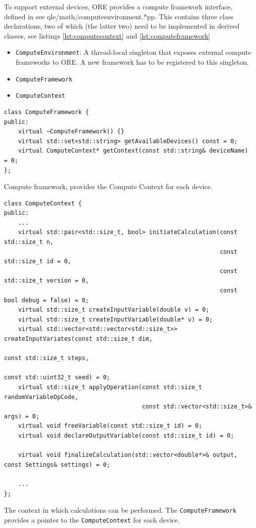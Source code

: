 \documentclass[12pt, a4paper]{report}
\begin{document}
To support external devices, ORE provides a compute framework interface, defined in
see qle/math/computeenvironment.*pp. This contains three class declarations, two of which (the latter two)
need to be implemented in derived classes, see listings \ref{lst:computecontext} and
\ref{lst:computeframework}
\begin{itemize}
\item {\tt ComputeEnvironment}: A thread-local singleton that exposes external compute frameworks to ORE. A new framework has to be registered to this singleton.
\item {\tt ComputeFramework}
\item {\tt ComputeContext} 
\end{itemize}

\begin{listing}[hbt]
\begin{verbatim}
class ComputeFramework {
public:
    virtual ~ComputeFramework() {}
    virtual std::set<std::string> getAvailableDevices() const = 0;
    virtual ComputeContext* getContext(const std::string& deviceName) = 0;
};
\end{verbatim}
\caption{Compute framework, provides the Compute Context for each device.}
\label{lst:computeframework}
\end{listing}

\begin{listing}[hbt]
\begin{verbatim}
class ComputeContext {
public:
    ...
    virtual std::pair<std::size_t, bool> initiateCalculation(const std::size_t n,
                                                             const std::size_t id = 0,
                                                             const std::size_t version = 0,
                                                             const bool debug = false) = 0;
    virtual std::size_t createInputVariable(double v) = 0;
    virtual std::size_t createInputVariable(double* v) = 0;
    virtual std::vector<std::vector<std::size_t>> createInputVariates(const std::size_t dim,
                                                                      const std::size_t steps,
                                                                      const std::uint32_t seed) = 0;
    virtual std::size_t applyOperation(const std::size_t randomVariableOpCode,
                                       const std::vector<std::size_t>& args) = 0;
    virtual void freeVariable(const std::size_t id) = 0;
    virtual void declareOutputVariable(const std::size_t id) = 0;

    virtual void finalizeCalculation(std::vector<double*>& output, const Settings& settings) = 0;

    ...    
};
\end{verbatim}
\caption{The context in which calculations can be performed. The {\tt ComputeFramework} provides a pointer
  to the {\tt ComputeContext} for each device.}
\label{lst:computecontext}
\end{listing}
\end{document}
